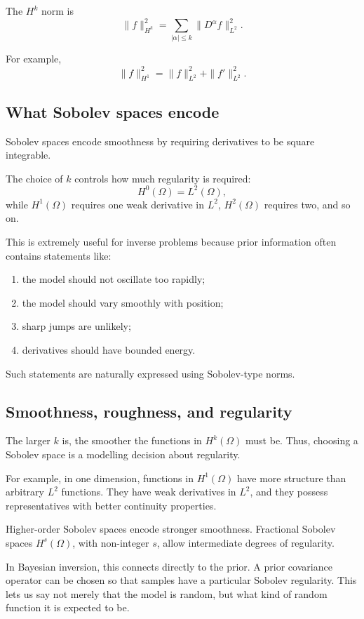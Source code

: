 \documentclass[11pt,a4paper]{book}
\begin{document}
The $H^k$ norm is
\[
    \|f\|_{H^k}^2
    =
    \sum_{|\alpha|\leq k}
    \|D^\alpha f\|_{L^2}^2.
\]

For example,
\[
    \|f\|_{H^1}^2
    =
    \|f\|_{L^2}^2
    +
    \|f'\|_{L^2}^2.
\]

\subsection{What Sobolev spaces encode}

Sobolev spaces encode smoothness by requiring derivatives to be square
integrable.

The choice of $k$ controls how much regularity is required:
\[
    H^0(\Omega)=L^2(\Omega),
\]
while $H^1(\Omega)$ requires one weak derivative in $L^2$, $H^2(\Omega)$
requires two, and so on.

This is extremely useful for inverse problems because prior information often
contains statements like:
\begin{enumerate}[label=\arabic*.]
    \item the model should not oscillate too rapidly;
    \item the model should vary smoothly with position;
    \item sharp jumps are unlikely;
    \item derivatives should have bounded energy.
\end{enumerate}

Such statements are naturally expressed using Sobolev-type norms.

\subsection{Smoothness, roughness, and regularity}

The larger $k$ is, the smoother the functions in $H^k(\Omega)$ must be. Thus,
choosing a Sobolev space is a modelling decision about regularity.

For example, in one dimension, functions in $H^1(\Omega)$ have more structure
than arbitrary $L^2$ functions. They have weak derivatives in $L^2$, and they
possess representatives with better continuity properties.

Higher-order Sobolev spaces encode stronger smoothness. Fractional Sobolev
spaces $H^s(\Omega)$, with non-integer $s$, allow intermediate degrees of
regularity.

In Bayesian inversion, this connects directly to the prior. A prior covariance
operator can be chosen so that samples have a particular Sobolev regularity.
This lets us say not merely that the model is random, but what kind of random
function it is expected to be.
\end{document}
